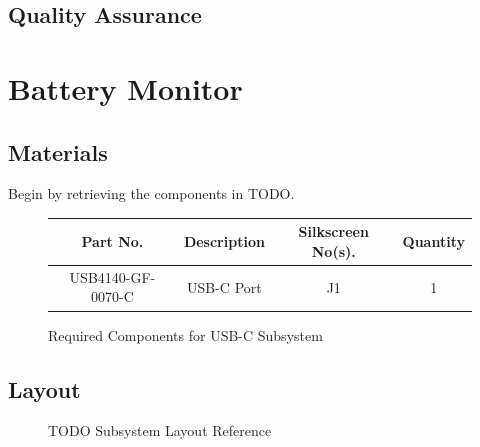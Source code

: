 \documentclass{article}
\begin{document}
\subsection{Quality Assurance}

\section{Battery Monitor}

\subsection{Materials}
Begin by retrieving the components in TODO.

\begin{figure}[H]
    \begin{center}
        \begin{tabular}{ c|c|c|c } 
            \textbf{Part No.} & \textbf{Description} & \textbf{Silkscreen No(s).} & \textbf{Quantity} \\ 
            \hline
            USB4140-GF-0070-C & USB-C Port & J1 & 1 \\ 
        \end{tabular}
    \end{center}
    \caption{Required Components for USB-C Subsystem}
    \label{tbl:TODO-materials}
\end{figure}

\subsection{Layout}

\begin{figure}[H]
    \centering
        \qquad
        \caption{TODO Subsystem Layout Reference}%
    \label{fig:TODO-layout}%
\end{figure}
\end{document}
